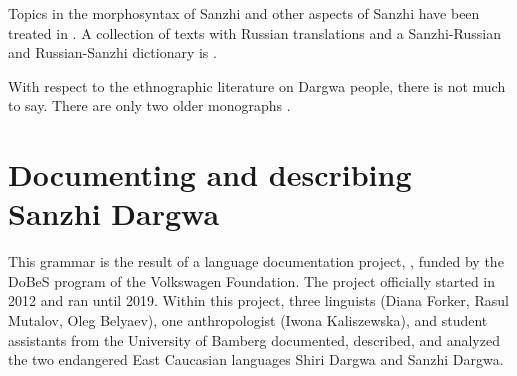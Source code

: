 Topics in the morphosyntax of Sanzhi and other aspects of Sanzhi have been treated in \citet{Forker2016a, Forker2014, Forker2019, ForkerSubmitteda, ForkerSubmittedb, ForkerSubmittedc}. A collection of texts with Russian translations and a Sanzhi-Russian and Russian-Sanzhi dictionary is \citet{Forker.Gadzhimuradov2017}.

With respect to the ethnographic literature on Dargwa people, there is not much to say. There are only two older monographs \citep{Schilling1949, Gadzieva.etal1967}.



\section{Documenting and describing Sanzhi Dargwa}
\label{sec:Documenting and describing Sanzhi Dargwa}

This grammar is the result of a language documentation project, , funded by the DoBeS program of the Volkswagen Foundation. The project officially started in 2012 and ran until 2019. Within this project, three linguists (Diana Forker, Rasul Mutalov, Oleg Belyaev), one anthropologist (Iwona Kaliszewska), and student assistants from the University of Bamberg documented, described, and analyzed the two endangered East Caucasian languages Shiri Dargwa and Sanzhi Dargwa.

